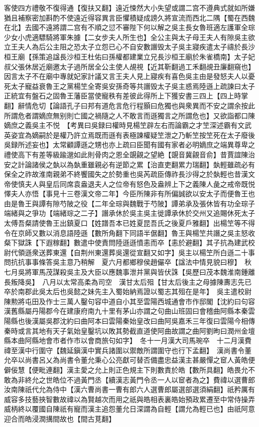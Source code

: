 客使四方禮敬不復得通【復扶又翻】遠近悚然大小失望或謂二宫不遵典式就如所嫌猶且補察密加斟酌不使遠近得容異言臣懼積疑成謗久將宣流而西北二隅【蜀在西魏在北】去國不遠將謂二宫有不順之愆不審陛下何以解之吳主長女魯班適左護軍全琮少女小虎適驃騎將軍朱據【二女步夫人所生也】全公主與太子母王夫人有隙吳主欲立王夫人為后公主阻之恐太子立怨已心不自安數譖毁太子吳主寢疾遣太子禱於長沙桓王廟【孫策追諡長沙桓王杜佑曰孫權都建業立兄長沙桓王廟於朱雀橋南】太子妃叔父張休居近廟邀太子過所居全公主使人覘視【近其靳翻過工禾翻覘丑廉翻窺也】因言太子不在廟中專就妃家計議又言王夫人見上寢疾有喜色吳主由是發怒夫人以憂死太子寵益衰魯王之黨楊笁全寄吳安孫奇等共譖毁太子吳主惑焉陸遜上疏諫曰太子正統宜有盤石之固魯王藩臣當使寵秩有差彼此得所上下獲安書三四上【四上時掌翻】辭情危切【論語孔子曰邦有道危言危行程顥曰危獨也與衆異而不安之謂余按此所謂危者謂嫡庶無别則亡國之禍隨之人不敢言而遜獨言之所謂危也】又欲詣都口陳嫡庶之義吳主不悦　【考異曰吳録曰權時見楊笁辟左右而論霸之才笁深述霸有文武英姿宜為嫡嗣於是權乃許立焉既而遜有表極諫權疑笁泄之乃斬笁按笁死在太子廢後吳録所述妄也】太常顧譚遜之甥也亦上疏曰臣聞有國有家者必明嫡庶之端異尊卑之禮使高下有差等級踰邈如此則骨肉之恩全覬覦之望絶【覬音冀覦音俞】昔賈誼陳治安之計論諸侯之埶以為埶重雖親必有逆節之累【治直吏翻累力瑞翻】埶輕雖疏必有保全之祚故淮南親弟不終饗國失之於勢重也吳芮疏臣傳祚長沙得之於埶輕也昔漢文帝使慎夫人與皇后同席袁盎退夫人之位帝有怒色及盎辨上下之義陳人彘之戒帝既悦懌夫人亦悟【事見十三卷漢文帝二年】今臣所陳非有所偏誠欲以安太子而便魯王也由是魯王與譚有隙芍陂之役【二年全琮與魏戰于芍陂】譚弟承及張休皆有功全琮子端緒與之爭功【端緒琮之二子】譖承休於吳主吳主徙譚承休於交州又追賜休死太子太傅吾粲請使魯王出鎮夏口【姓譜吾本已姓夏昆吾氏之後夏戶雅翻】出楊笁等不得令在京師又數以消息語陸遜【數所角翻下同語半倨翻】魯王與楊笁共譖之吳主怒收粲下獄誅【下遐稼翻】數遣中使責問陸遜遜憤恚而卒【恚於避翻】其子抗為建武校尉代領遜衆送葬東還【自荆州東還葬吳還從宣翻又如字】吳主以楊笁所白遜二十事問抗抗事事條答吳主意乃稍解　夏六月都鄉穆侯趙儼卒【諡法中情見貌曰穆】　秋七月吳將軍馬茂謀殺吳主及大臣以應魏事泄并黨與皆伏誅【吳歷曰茂本魏淮南鍾離長叛降吳】　八月以太常高柔為司空　漢甘太后殂【甘太后後主之母據陳夀志先已卒於南郡此吳太后也吳懿之妹先主入蜀始納焉證以蜀志其殂在是年】　吳主遣校尉陳勲將屯田及作士三萬人鑿句容中道自小其至雲陽西城通會市作邸閣【沈約曰句容漢舊縣屬丹陽郡今在建康府南九十里有茅山亦謂之句曲山班固曰會稽曲阿縣本秦雲陽縣也後漢屬吳郡沈約曰曲阿本曰雲陽秦始皇改曰曲阿吳嘉禾三年復曰雲陽今相傳秦時或言其地有天子氣始皇鑿坑以敗其勢截直道使阿曲故謂之曲阿劉昫曰潤州金壇縣本曲阿縣地會市者作市以會商旅句如字】　冬十一月漢大司馬琬卒　十二月漢費禕至漢中行圍守【魏延鎭漢中實兵諸圍以禦敵所謂圍守也行下孟翻】　漢尚書令董允卒以尚書呂乂為尚書令董允秉心公亮獻可替否備盡忠益漢主甚嚴憚之䆠人黃皓便僻佞慧【便毗連翻】漢主愛之允上則正色規主下則數責於皓【數所具翻】皓畏允不敢為非終允之世皓位不過黃門丞【續漢志黃門令丞一人以䆠者為之】費禕以選曹郎汝南陳祇代允為侍中【漢六曹尚書一曹有郎六人選曹郎屬選部選須絹翻】祇矜厲有威容多技藝挾智數故禕以為賢越次而用之祇與皓相表裏皓始預政累遷至中常侍操弄威柄終以覆國自陳祇有寵而漢主追怨董允日深謂為自輕【謂允為輕已也】由祇阿意迎合而皓浸潤搆間故也【間古莧翻】

